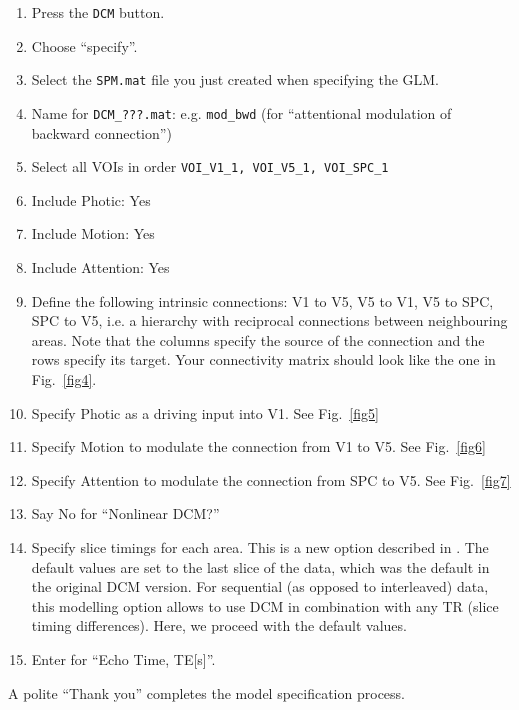 \begin{enumerate}
\item{Press the \texttt{DCM} button.}
\item{Choose ``specify''.}
\item{Select the \texttt{SPM.mat} file you just created when specifying the GLM.}
\item{Name for \verb!DCM_???.mat!:  e.g. \verb!mod_bwd! (for ``attentional modulation of backward connection'')}
\item{Select all VOIs in order \verb!VOI_V1_1, VOI_V5_1, VOI_SPC_1!}
\item{Include Photic: Yes}
\item{Include Motion: Yes}
\item{Include Attention: Yes}
\item{Define the following intrinsic connections: V1 to V5, V5 to V1, V5 to SPC, SPC to V5, i.e. a hierarchy with reciprocal connections between neighbouring areas. Note that the columns specify the source of the connection and the rows specify its target. Your connectivity matrix should look like the one in Fig.~\ref{fig4}.}
\item{Specify Photic as a driving input into V1.  See Fig.~\ref{fig5}}
\item{Specify Motion to modulate the connection from V1 to V5.  See Fig.~\ref{fig6}}
\item{Specify Attention to modulate the connection from SPC to V5.  See Fig.~\ref{fig7}}
\item{Say No for ``Nonlinear DCM?''}
\item{Specify slice timings for each area. This is a new option described in \cite{sjk_dcm_slicetiming}. The default values are set to the last slice of the data, which was the default in the original DCM version. For sequential (as opposed to interleaved) data, this modelling option allows to use DCM in combination with any TR (slice timing differences). Here, we proceed with the default values.}
\item{Enter \texttt{} for ``Echo Time, TE[s]''.}
\end{enumerate}
A polite ``Thank you'' completes the model specification process.

